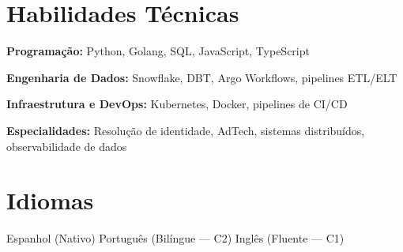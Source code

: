 \documentclass[10pt,a4paper]{article}
\begin{document}
\section*{Habilidades Técnicas}

\textbf{Programação:} Python, Golang, SQL, JavaScript, TypeScript

\textbf{Engenharia de Dados:} Snowflake, DBT, Argo Workflows, pipelines ETL/ELT

\textbf{Infraestrutura e DevOps:} Kubernetes, Docker, pipelines de CI/CD

\textbf{Especialidades:} Resolução de identidade, AdTech, sistemas distribuídos,
observabilidade de dados

\section*{Idiomas}

Espanhol (Nativo)
\quad\textperiodcentered\quad Português (Bilíngue --- C2)
\quad\textperiodcentered\quad Inglês (Fluente --- C1)
\end{document}
